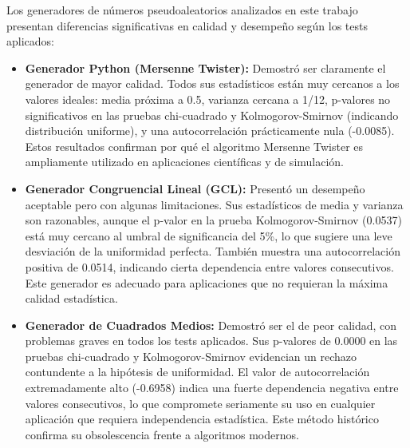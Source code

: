 \documentclass{article}
\begin{document}
Los generadores de números pseudoaleatorios analizados en este trabajo presentan diferencias significativas en calidad y desempeño según los tests aplicados:

\begin{itemize} 
    \item \textbf{Generador Python (Mersenne Twister):} Demostró ser claramente el generador de mayor calidad. Todos sus estadísticos están muy cercanos a los valores ideales: media próxima a 0.5, varianza cercana a 1/12, p-valores no significativos en las pruebas chi-cuadrado y Kolmogorov-Smirnov (indicando distribución uniforme), y una autocorrelación prácticamente nula (-0.0085). Estos resultados confirman por qué el algoritmo Mersenne Twister es ampliamente utilizado en aplicaciones científicas y de simulación.
    \item \textbf{Generador Congruencial Lineal (GCL):} Presentó un desempeño aceptable pero con algunas limitaciones. Sus estadísticos de media y varianza son razonables, aunque el p-valor en la prueba Kolmogorov-Smirnov (0.0537) está muy cercano al umbral de significancia del 5\%, lo que sugiere una leve desviación de la uniformidad perfecta. También muestra una autocorrelación positiva de 0.0514, indicando cierta dependencia entre valores consecutivos. Este generador es adecuado para aplicaciones que no requieran la máxima calidad estadística.
    \item \textbf{Generador de Cuadrados Medios:} Demostró ser el de peor calidad, con problemas graves en todos los tests aplicados. Sus p-valores de 0.0000 en las pruebas chi-cuadrado y Kolmogorov-Smirnov evidencian un rechazo contundente a la hipótesis de uniformidad. El valor de autocorrelación extremadamente alto (-0.6958) indica una fuerte dependencia negativa entre valores consecutivos, lo que compromete seriamente su uso en cualquier aplicación que requiera independencia estadística. Este método histórico confirma su obsolescencia frente a algoritmos modernos.
\end{itemize}
    
\end{document}
